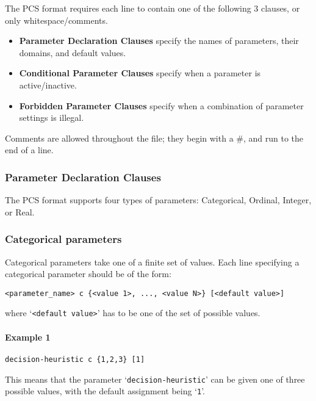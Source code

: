 \documentclass[manual.tex]{subfiles}
\begin{document}
The PCS format requires each line to contain one of the following 3 clauses, or only whitespace/comments.
\begin{itemize}
\item \textbf{Parameter Declaration Clauses} specify the names of parameters, their domains, and default values.
\item \textbf{Conditional Parameter Clauses} specify when a parameter is active/inactive.
\item \textbf{Forbidden Parameter Clauses} specify when a combination of parameter settings is illegal.
\end{itemize}
Comments are allowed throughout the file; they begin with a \#, and run to the end of a line. 

\subsubsection{Parameter Declaration Clauses}\label{sec:param_decl_clauses}

The PCS format supports four types of parameters: Categorical, Ordinal, Integer, or Real.

\subsubsection*{Categorical parameters} \label{sec:categorical-params}
Categorical parameters take one of a finite set of values. Each line specifying a categorical parameter should be of the form:

\begin{verbatim}
<parameter_name> c {<value 1>, ..., <value N>} [<default value>]
\end{verbatim}
where `\texttt{<default value>}' has to be one of the set of possible values. 

\paragraph{Example 1}
\begin{verbatim}
decision-heuristic c {1,2,3} [1]
\end{verbatim}
This means that the parameter `\texttt{decision-heuristic}' can be given one of three possible values, with the default assignment being `\texttt{1}'.
\end{document}

